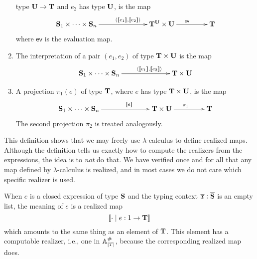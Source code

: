 \begin{enumerate}
  type $\mathbf{U} \to \mathbf{T}$ and $e_2$ has type $\mathbf{U}$, is the map
  \begin{equation*}
    \xymatrix@+2em{
      **[l]{\asm{S}_1 \times \cdots \times \asm{S}_n}
      \ar[r]^{\pair{\sem{e_1}, \sem{e_2}}}
      &
      {\asm{T}^{\asm{U}} \times \asm{U}}
      \ar[r]^{\mathsf{ev}}
      &
      {\asm{T}}      
    }
  \end{equation*}
  where $\mathsf{ev}$ is the evaluation map.
\item The interpretation of a pair $(e_1, e_2)$ of type $\mathbf{T}
  \times \mathbf{U}$ is the map
  \begin{equation*}
    \xymatrix@+2em{
      **[l]{\asm{S}_1 \times \cdots \times \asm{S}_n}
      \ar[r]^{\pair{\sem{e_1}, \sem{e_2}}}
      &
      {\asm{T} \times \asm{U}}
    }
  \end{equation*}
\item A projection $\pi_1(e)$ of type $\mathbf{T}$, where $e$ has type
  $\mathbf{T} \times \mathbf{U}$, is the map
  \begin{equation*}
    \xymatrix@+2em{
      **[l]{\asm{S}_1 \times \cdots \times \asm{S}_n}
      \ar[r]^{\sem{e}}
      &
      {\asm{T} \times \asm{U}}
      \ar[r]^{\pi_1}
      &
      {\asm{T}}
    }
  \end{equation*}
  The second projection $\pi_2$ is treated analogously.
\end{enumerate}
%
This definition shows that we may freely use $\lambda$-calculus to
define realized maps. Although the definition tells us exactly how to
compute the realizers from the expressions, the idea is to \emph{not}
do that. We have verified once and for all that any map defined by
$\lambda$-calculus is realized, and in most cases we do not care which
specific realizer is used.

When $e$ is a closed expression of type $\mathbf{S}$ and the typing
context $\overline{x} : \overline{\mathbf{S}}$ is an empty list, the
meaning of $e$ is a realized map
%
\begin{equation*}
  [\![{\cdot} \mid e : \mathsf{1} \to \mathbf{T}]\!]
\end{equation*}
%
which amounts to the same thing as an element of $\mathbf{T}$. This
element has a computable realizer, i.e., one in $\mathbb{A}^{\#}_{|T|}$,
because the corresponding realized map does.

